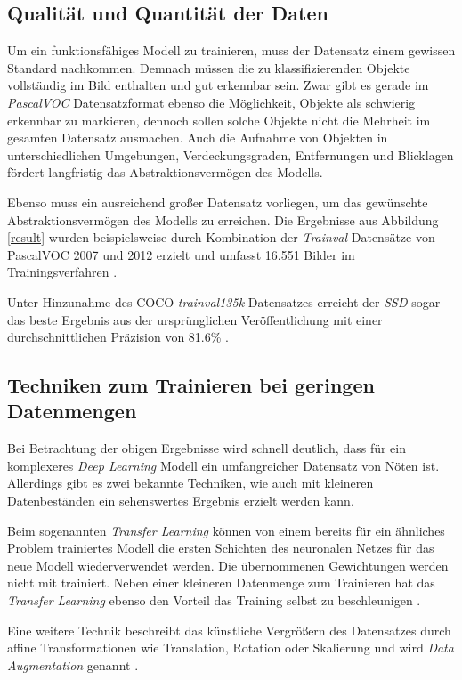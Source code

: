 \subsection*{Qualität und Quantität der Daten}

Um ein funktionsfähiges Modell zu trainieren, muss der Datensatz einem gewissen Standard nachkommen. Demnach müssen die zu klassifizierenden Objekte vollständig im Bild enthalten und gut erkennbar sein. Zwar gibt es gerade im \textit{PascalVOC} Datensatzformat ebenso die Möglichkeit, Objekte als \glqq schwierig erkennbar\grqq{} zu markieren, dennoch sollen solche Objekte nicht die Mehrheit im gesamten Datensatz ausmachen. Auch die Aufnahme von Objekten in unterschiedlichen Umgebungen, Verdeckungsgraden, Entfernungen und Blicklagen fördert langfristig das Abstraktionsvermögen des Modells. 

Ebenso muss ein ausreichend großer Datensatz vorliegen, um das gewünschte Abstraktionsvermögen des Modells zu erreichen. Die Ergebnisse aus Abbildung \ref{result} wurden beispielsweise durch Kombination der \textit{Trainval} Datensätze von PascalVOC 2007 und 2012 erzielt und umfasst 16.551 Bilder im Trainingsverfahren \cite{ssd.20161229, MarkEveringham.20070607, MarkEveringham.20120521}. 

Unter Hinzunahme des COCO \textit{trainval135k} Datensatzes erreicht der \textit{SSD} sogar das beste Ergebnis aus der ursprünglichen Veröffentlichung mit einer durchschnittlichen Präzision von 81.6\% \cite{ssd.20161229}. 

\subsection*{Techniken zum Trainieren bei geringen Datenmengen}

Bei Betrachtung der obigen Ergebnisse wird schnell deutlich, dass für ein komplexeres \textit{Deep Learning} Modell ein umfangreicher Datensatz von Nöten ist. Allerdings gibt es zwei bekannte Techniken, wie auch mit kleineren Datenbeständen ein sehenswertes Ergebnis erzielt werden kann. 

Beim sogenannten \textit{Transfer Learning} können von einem bereits für ein ähnliches Problem trainiertes Modell die ersten Schichten des neuronalen Netzes für das neue Modell wiederverwendet werden. Die übernommenen Gewichtungen werden nicht mit trainiert. Neben einer kleineren Datenmenge zum Trainieren hat das \textit{Transfer Learning} ebenso den Vorteil das Training selbst zu beschleunigen \cite{AurelienGeron.2018}.

Eine weitere Technik beschreibt das künstliche Vergrößern des Datensatzes durch affine Transformationen wie Translation, Rotation oder Skalierung und wird \textit{Data Augmentation} genannt \cite{AurelienGeron.2018}.
